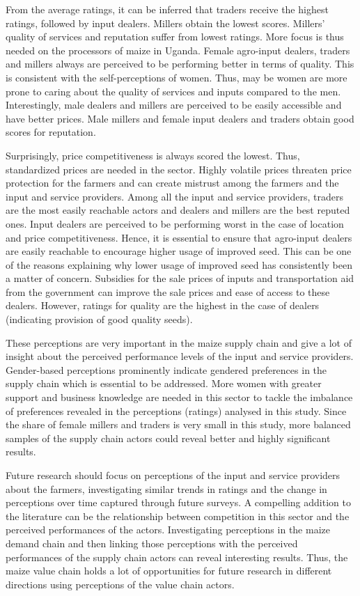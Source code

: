 \documentclass[12pt,english]{article}\usepackage[]{graphicx}\usepackage[]{color}
\begin{document}
From the average ratings, it can be inferred that traders receive
the highest ratings, followed by input dealers. Millers obtain the
lowest scores. Millers' quality of services and reputation suffer
from lowest ratings. More focus is thus needed on the processors of
maize in Uganda. Female agro-input dealers, traders and millers always
are perceived to be performing better in terms of quality. This is
consistent with the self-perceptions of women. Thus, may be women
are more prone to caring about the quality of services and inputs
compared to the men. Interestingly, male dealers and millers are perceived
to be easily accessible and have better prices. Male millers and female
input dealers and traders obtain good scores for reputation. 

Surprisingly, price competitiveness is always scored the lowest. Thus,
standardized prices are needed in the sector. Highly volatile prices
threaten price protection for the farmers and can create mistrust
among the farmers and the input and service providers. Among all the
input and service providers, traders are the most easily reachable
actors and dealers and millers are the best reputed ones. Input dealers
are perceived to be performing worst in the case of location and price
competitiveness. Hence, it is essential to ensure that agro-input
dealers are easily reachable to encourage higher usage of improved
seed. This can be one of the reasons explaining why lower usage of
improved seed has consistently been a matter of concern. Subsidies
for the sale prices of inputs and transportation aid from the government
can improve the sale prices and ease of access to these dealers. However,
ratings for quality are the highest in the case of dealers (indicating
provision of good quality seeds). 

These perceptions are very important in the maize supply chain and
give a lot of insight about the perceived performance levels of the
input and service providers. Gender-based perceptions prominently
indicate gendered preferences in the supply chain which is essential
to be addressed. More women with greater support and business knowledge
are needed in this sector to tackle the imbalance of preferences revealed
in the perceptions (ratings) analysed in this study. Since the share
of female millers and traders is very small in this study, more balanced
samples of the supply chain actors could reveal better and highly
significant results. 

Future research should focus on perceptions of the input and service
providers about the farmers, investigating similar trends in ratings
and the change in perceptions over time captured through future surveys.
A compelling addition to the literature can be the relationship between
competition in this sector and the perceived performances of the actors.
Investigating perceptions in the maize demand chain and then linking
those perceptions with the perceived performances of the supply chain
actors can reveal interesting results. Thus, the maize value chain
holds a lot of opportunities for future research in different directions
using perceptions of the value chain actors. 

\newpage{}
\begin{onehalfspace}

\end{onehalfspace}
\end{document}
